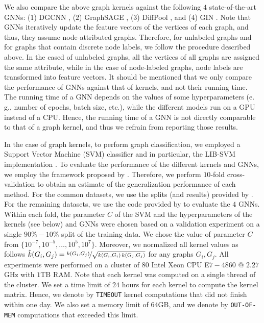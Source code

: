 \documentclass[twoside,11pt]{article}
\newcommand{\eg}{e.\,g., }
\begin{document}
We also compare the above graph kernels against the following $4$ state-of-the-art GNNs: ($1$) DGCNN , ($2$) GraphSAGE , ($3$) DiffPool , and ($4$) GIN .
Note that GNNs iteratively update the feature vectors of the vertices of each graph, and thus, they assume node-attributed graphs.
Therefore, for unlabeled graphs and for graphs that contain discrete node labels, we follow the procedure described above.
In the cased of unlabeled graphs, all the vertices of all graphs are assigned the same attribute, while in the case of node-labeled graphs, node labels are transformed into feature vectors.
It should be mentioned that we only compare the performance of GNNs against that of kernels, and not their running time.
The running time of a GNN depends on the values of some hyperparameters (\eg number of epochs, batch size, etc.), while the different models run on a GPU instead of a CPU.
Hence, the running time of a GNN is not directly comparable to that of a graph kernel, and thus we refrain from reporting those results.

In the case of graph kernels, to perform graph classification, we employed a Support Vector Machine (SVM) classifier and in particular, the LIB-SVM implementation .
To evaluate the performance of the different kernels and GNNs, we employ the framework proposed by .
Therefore, we perform $10$-fold cross-validation to obtain an estimate of the generalization performance of each method.
For the common datasets, we use the splits (and results) provided by .
For the remaining datasets, we use the code provided by  to evaluate the $4$ GNNs.
Within each fold, the parameter $C$ of the SVM and the hyperparameters of the kernels (see below) and GNNs were chosen based on a validation experiment on a single $90\%-10\%$ split of the training data.
We chose the value of parameter $C$ from $\{10^{-7},10^{-5},\ldots,10^5,10^7\}$.
Moreover, we normalized all kernel values as follows $\hat{k}(G_i, G_j) = \nicefrac{k(G_i,G_j)}{\sqrt{k(G_i, G_i) \, k(G_j, G_j)}}$ for any graphs $G_i, G_j$.
All experiments were performed on a cluster of $80$ Intel\textsuperscript{\textcopyright} Xeon\textsuperscript{\textcopyright} CPU E$7-4860$ @ $2.27$GHz with $1$TB RAM.
Note that each kernel was computed on a single thread of the cluster.
We set a time limit of $24$ hours for each kernel to compute the kernel matrix.
Hence, we denote by \texttt{TIMEOUT} kernel computations that did not finish within one day.
We also set a memory limit of $64$GB, and we denote by \texttt{OUT-OF-MEM} computations that exceeded this limit.
\end{document}
